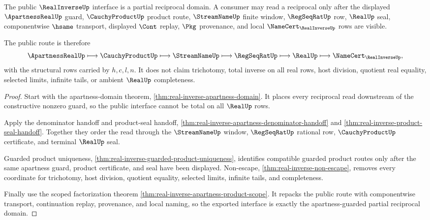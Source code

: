 \begin{theorem}
\label{thm:realinverse-public-inverse-domain}
The public $\RealInverseUp$ interface is a partial reciprocal domain. A consumer may read a reciprocal only after the displayed $\ApartnessRealUp$ guard, $\CauchyProductUp$ product route, $\StreamNameUp$ finite window, $\RegSeqRatUp$ row, $\RealUp$ seal, componentwise $\hsame$ transport, displayed $\Cont$ replay, $\Pkg$ provenance, and local $\NameCert_{\RealInverseUp}$ rows are visible.

The public route is therefore
$$
\ApartnessRealUp \longmapsto \CauchyProductUp \longmapsto
\StreamNameUp \longmapsto \RegSeqRatUp \longmapsto \RealUp
\longmapsto \NameCert_{\RealInverseUp},
$$
with the structural rows carried by $h,c,l,n$. It does not claim trichotomy, total inverse on all real rows, host division, quotient real equality, selected limits, infinite tails, or ambient $\RealUp$ completeness.
\end{theorem}
\begin{proof}
Start with the apartness-domain theorem, \autoref{thm:real-inverse-apartness-domain}. It places every reciprocal read downstream of the constructive nonzero guard, so the public interface cannot be total on all $\RealUp$ rows.

Apply the denominator handoff and product-seal handoff, \autoref{thm:real-inverse-apartness-denominator-handoff} and \autoref{thm:real-inverse-product-seal-handoff}. Together they order the read through the $\StreamNameUp$ window, $\RegSeqRatUp$ rational row, $\CauchyProductUp$ certificate, and terminal $\RealUp$ seal.

Guarded product uniqueness, \autoref{thm:real-inverse-guarded-product-uniqueness}, identifies compatible guarded product routes only after the same apartness guard, product certificate, and seal have been displayed. Non-escape, \autoref{thm:real-inverse-non-escape}, removes every coordinate for trichotomy, host division, quotient equality, selected limits, infinite tails, and completeness.

Finally use the scoped factorization theorem \autoref{thm:real-inverse-apartness-product-scope}. It repacks the public route with componentwise transport, continuation replay, provenance, and local naming, so the exported interface is exactly the apartness-guarded partial reciprocal domain.
\end{proof}

